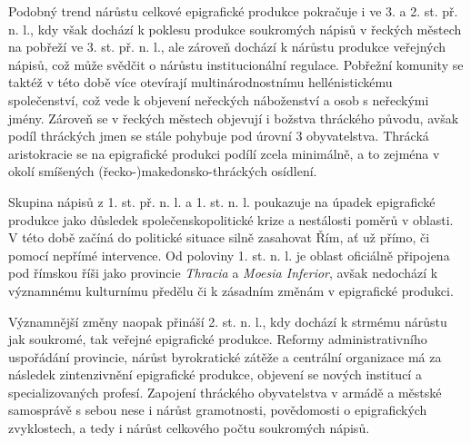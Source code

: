 Podobný trend nárůstu celkové epigrafické produkce pokračuje i ve 3. a 2. st. př. n. l., kdy však dochází k poklesu produkce soukromých nápisů v řeckých městech na pobřeží ve 3. st. př. n. l., ale zároveň dochází k nárůstu produkce veřejných nápisů, což může svědčit o nárůstu institucionální regulace. Pobřežní komunity se taktéž v této době více otevírají multinárodnostnímu hellénistickému společenství, což vede k objevení neřeckých náboženství a osob s neřeckými jmény. Zároveň se v řeckých městech objevují i božstva thráckého původu, avšak podíl thráckých jmen se stále pohybuje pod úrovní 3  obyvatelstva. Thrácká aristokracie se na epigrafické produkci podílí zcela minimálně, a to zejména v okolí smíšených (řecko-)makedonsko-thráckých osídlení.

Skupina nápisů z 1. st. př. n. l. a 1. st. n. l. poukazuje na úpadek epigrafické produkce jako důsledek společenskopolitické krize a nestálosti poměrů v oblasti. V této době začíná do politické situace silně zasahovat Řím, ať už přímo, či pomocí nepřímé intervence. Od poloviny 1. st. n. l. je oblast oficiálně připojena pod římskou říši jako provincie {\em Thracia} a {\em Moesia Inferior}, avšak nedochází k významnému kulturnímu předělu či k zásadním změnám v epigrafické produkci.

Významnější změny naopak přináší 2. st. n. l., kdy dochází k strmému nárůstu jak soukromé, tak veřejné epigrafické produkce. Reformy administrativního uspořádání provincie, nárůst byrokratické zátěže a centrální organizace má za následek zintenzivnění epigrafické produkce, objevení se nových institucí a specializovaných profesí. Zapojení thráckého obyvatelstva v armádě a městské samosprávě s sebou nese i nárůst gramotnosti, povědomosti o epigrafických zvyklostech, a tedy i nárůst celkového počtu soukromých nápisů.

